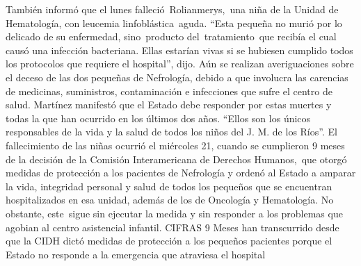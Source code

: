 \documentclass{article}%
\begin{document}
\newline%
%
También informó que el lunes falleció~Rolianmerys,~una niña de la Unidad de Hematología, con leucemia linfoblástica~aguda. “Esta pequeña no murió por lo delicado de su enfermedad, sino~producto del~tratamiento~que recibía el cual causó una infección bacteriana. Ellas estarían vivas si se hubiesen cumplido todos los protocolos que requiere el hospital”, dijo.%
\newline%
%
Aún se realizan averiguaciones sobre el deceso de las dos pequeñas de Nefrología, debido a que involucra las carencias de medicinas, suministros, contaminación e infecciones que sufre el centro de salud. Martínez manifestó que el Estado debe responder por estas muertes y todas la que han ocurrido en los últimos dos años. “Ellos son los únicos responsables de la vida y la salud de todos los niños del J. M. de los Ríos”.%
\newline%
%
El fallecimiento de las niñas ocurrió el miércoles 21, cuando se cumplieron 9 meses de la decisión de la Comisión Interamericana de Derechos Humanos,~que otorgó medidas de protección a los pacientes de Nefrología y ordenó al Estado a amparar la vida, integridad personal y salud de todos los pequeños que se encuentran hospitalizados en esa unidad, además de los de Oncología y Hematología. No obstante, este~sigue sin ejecutar la medida y sin responder a los problemas que agobian al centro asistencial infantil.%
\newline%
%
CIFRAS%
\newline%
%
9 Meses han transcurrido desde que la CIDH dictó medidas de protección a los pequeños pacientes porque el Estado no responde a la emergencia que atraviesa el hospital%
\newline%
%
\end{document}
